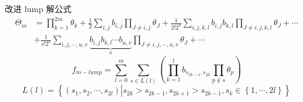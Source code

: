 \documentclass{beamer}
\newcommand{\sbrace}[1]{\left(#1\right)}
\newcommand{\bbrace}[1]{\left\{#1\right\}}
\begin{document}
\begin{frame}{改进 lump 解公式}
\begin{equation}
\begin{aligned}
\Theta_m&=\prod_{k=1}^{2m}\theta_k+\frac{1}{2}\sum_{i,j}{b_{i,j}}\prod_{J\neq i,j}{\theta_J}+\frac{1}{2! 2^2}\sum_{i,j,k,l}{b_{i,j}b_{k,l}}\prod_{J\neq i,j,k,l}{\theta_{J}}+\cdots \\
&+\frac{1}{s!2^s}\sum_{i,j,\cdots,u,v}\underbrace{{b_{i,j}b_{k,l}\cdots b_{u,v}}}_{s}\prod_{J\neq i,j,\cdots, u,v}{\theta_J}+\cdots 
\end{aligned}
\end{equation}
\pause 
\vfill
\begin{equation}
f_{m-lump}=\sum_{l=0}^m\sum_{s\in L(l)}\sbrace{\prod_{k=1}^l{b_{s_{2k-1},s_{2k}}}\prod_{p\not\in s}{\theta_p}}
\end{equation}
\begin{equation*}
  L(l)=\bbrace{\sbrace{s_1, s_2, \cdots ,s_{2l}}\left|s_{2k}>s_{2k-1},s_{2k+1}>s_{2k-1},s_k\in \bbrace{1,\cdots,2l}\right.}
\end{equation*}
\end{frame}
\end{document}
